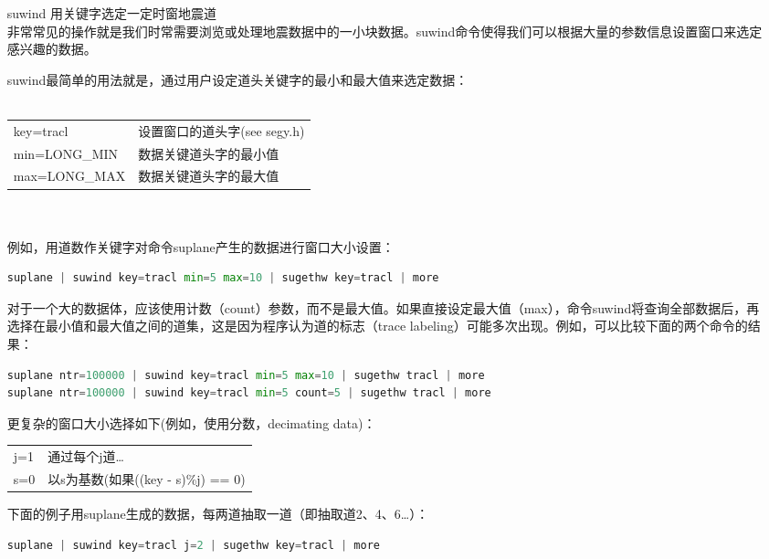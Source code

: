 \begin{enumerate}
	\item[suwind] 用关键字选定一定时窗地震道\\
	非常常见的操作就是我们时常需要浏览或处理地震数据中的一小块数据。suwind命令使得我们可以根据大量的参数信息设置窗口来选定感兴趣的数据。\par\mvspace
	\par
	suwind最简单的用法就是，通过用户设定道头关键字的最小和最大值来选定数据：\\\\
	\begin{tabular}{ll}
		\toprule
		key=tracl & 设置窗口的道头字(see segy.h)\\
		min=LONG\_MIN &   数据关键道头字的最小值\\
		max=LONG\_MAX &   数据关键道头字的最大值\\
		\bottomrule
	\end{tabular}\\\\
	例如，用道数作关键字对命令suplane产生的数据进行窗口大小设置：
\begin{lstlisting}[language=python] 
suplane | suwind key=tracl min=5 max=10 | sugethw key=tracl | more
\end{lstlisting}
	对于一个大的数据体，应该使用计数（count）参数，而不是最大值。如果直接设定最大值（max），命令suwind将查询全部数据后，再选择在最小值和最大值之间的道集，这是因为程序认为道的标志（trace labeling）可能多次出现。例如，可以比较下面的两个命令的结果：\\
\begin{lstlisting}[language=python] 
suplane ntr=100000 | suwind key=tracl min=5 max=10 | sugethw tracl | more	
suplane ntr=100000 | suwind key=tracl min=5 count=5 | sugethw tracl | more
\end{lstlisting}	
	更复杂的窗口大小选择如下(例如，使用分数，decimating data)：\par
	\mvspace
	\begin{tabular}{ll}
		\toprule
		j=1 & 通过每个j道…	\\
		s=0 & 以s为基数(如果((key - s)\%j) == 0) \\
		\bottomrule
	\end{tabular}\par
	\mvspace
	下面的例子用suplane生成的数据，每两道抽取一道（即抽取道2、4、6…）：
\begin{lstlisting}[language=python]
suplane | suwind key=tracl j=2 | sugethw key=tracl | more
\end{lstlisting}	

\end{enumerate}

